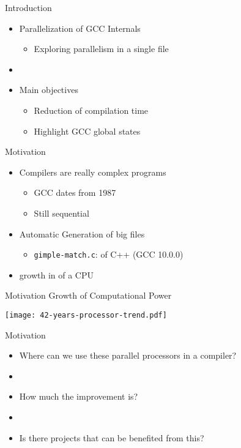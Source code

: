 \begin{frame}{Introduction}
    \begin{itemize}
        \item Parallelization of GCC Internals
        \begin{itemize}
            \item Exploring parallelism in a single file
        \end{itemize}
        \item[]
        \item Main objectives
        \begin{itemize}
            \item Reduction of compilation time
            \item Highlight GCC global states
        \end{itemize}
    \end{itemize}
\end{frame}

\begin{frame}{Motivation}
  \begin{itemize}
    \item Compilers are really complex programs
        \begin{itemize}
            \item GCC dates from 1987
            \item Still sequential
        \end{itemize}
    \item Automatic Generation of big files
        \begin{itemize}
            \item \texttt{gimple-match.c}: {\color{red}{100358 lines}} of C++ (GCC 10.0.0)
        \end{itemize}
    \item {\color{red}{Exponencial}} growth in {\color{blue}{number of cores}} of a CPU
  \end{itemize}
\end{frame}

\begin{frame}{Motivation}
    Growth of Computational Power \citep{42years}

    \centering
    \texttt{[image: 42-years-processor-trend.pdf]}
    \label{fig:42years}
\end{frame}


\begin{frame}{Motivation}
  \begin{itemize}
    \item Where can we use these parallel processors in a compiler?
    \item []
    \item How much the improvement is?
    \item []
    \item Is there projects that can be benefited from this?
  \end{itemize}
\end{frame}


